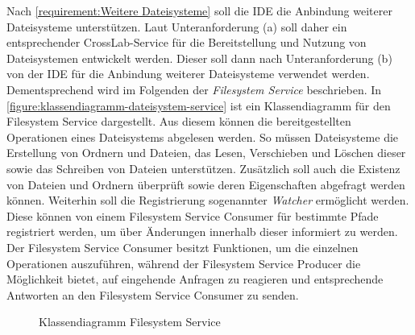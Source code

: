 Nach \autoref{requirement:Weitere Dateisysteme} soll die IDE die Anbindung weiterer Dateisysteme unterstützen. Laut Unteranforderung (a) soll daher ein entsprechender CrossLab-Service für die Bereitstellung und Nutzung von Dateisystemen entwickelt werden. Dieser soll dann nach Unteranforderung (b) von der IDE für die Anbindung weiterer Dateisysteme verwendet werden. Dementsprechend wird im Folgenden der \textit{Filesystem Service} beschrieben. In \autoref{figure:klassendiagramm-dateisystem-service} ist ein Klassendiagramm für den Filesystem Service dargestellt. Aus diesem können die bereitgestellten Operationen eines Dateisystems abgelesen werden. So müssen Dateisysteme die Erstellung von Ordnern und Dateien, das Lesen, Verschieben und Löschen dieser sowie das Schreiben von Dateien unterstützen. Zusätzlich soll auch die Existenz von Dateien und Ordnern überprüft sowie deren Eigenschaften abgefragt werden können. Weiterhin soll die Registrierung sogenannter \textit{Watcher} ermöglicht werden. Diese können von einem Filesystem Service Consumer für bestimmte Pfade registriert werden, um über Änderungen innerhalb dieser informiert zu werden. Der Filesystem Service Consumer besitzt Funktionen, um die einzelnen Operationen auszuführen, während der Filesystem Service Producer die Möglichkeit bietet, auf eingehende Anfragen zu reagieren und entsprechende Antworten an den Filesystem Service Consumer zu senden.

\begin{figure}[tbp]
    \centering
    \caption{Klassendiagramm Filesystem Service}
    \label{figure:klassendiagramm-dateisystem-service}
\end{figure}

